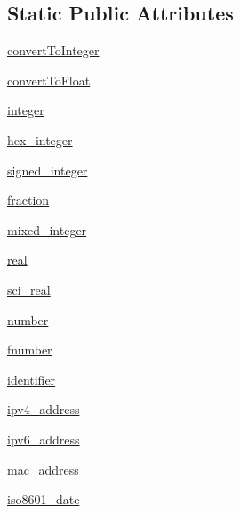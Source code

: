 \subsection*{Static Public Attributes}
\begin{DoxyCompactItemize}
\item 
\hyperlink{classpyparsing_1_1pyparsing__common_a4391aadde194d162e514a5f3e5e08d3f}{convert\+To\+Integer}
\item 
\hyperlink{classpyparsing_1_1pyparsing__common_a9a0ec86c1116b2a87e58fde47e14fc58}{convert\+To\+Float}
\item 
\hyperlink{classpyparsing_1_1pyparsing__common_a64ed48f9a0eff6a568b28d9758f3d7f9}{integer}
\item 
\hyperlink{classpyparsing_1_1pyparsing__common_aa56632d9a88ace63d2e8a59501414545}{hex\+\_\+integer}
\item 
\hyperlink{classpyparsing_1_1pyparsing__common_ab57f71591a505571800f7f7aedfb29b1}{signed\+\_\+integer}
\item 
\hyperlink{classpyparsing_1_1pyparsing__common_acd0ea70bddc60a305719eda2e63a37c1}{fraction}
\item 
\hyperlink{classpyparsing_1_1pyparsing__common_af825ac3c838533d13afbf091676ca516}{mixed\+\_\+integer}
\item 
\hyperlink{classpyparsing_1_1pyparsing__common_a2c540a81e4350bad59843ea0a5af6f94}{real}
\item 
\hyperlink{classpyparsing_1_1pyparsing__common_a03abcbdf89f3d6578bdb2423b4a72267}{sci\+\_\+real}
\item 
\hyperlink{classpyparsing_1_1pyparsing__common_a680e0afd1295ecaa3f46669c3355b03d}{number}
\item 
\hyperlink{classpyparsing_1_1pyparsing__common_a432026b58c62d36d5abdd942cb6b4424}{fnumber}
\item 
\hyperlink{classpyparsing_1_1pyparsing__common_a8e5f3617eb27e5284235d6fb4341bd57}{identifier}
\item 
\hyperlink{classpyparsing_1_1pyparsing__common_a8d1ea8da999eef2cf6edc3477058e272}{ipv4\+\_\+address}
\item 
\hyperlink{classpyparsing_1_1pyparsing__common_a99efad60708582d14e5f8cf194ff96d3}{ipv6\+\_\+address}
\item 
\hyperlink{classpyparsing_1_1pyparsing__common_abbf1389242f229773655624168a82f9b}{mac\+\_\+address}
\item 
\hyperlink{classpyparsing_1_1pyparsing__common_ace8fb57bfc534991dcf2c22f15573ea9}{iso8601\+\_\+date}
\item 

\end{DoxyCompactItemize}
